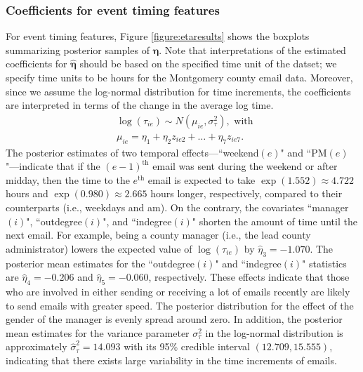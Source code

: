 \documentclass[ba]{imsart}
\numberwithin{equation}{section}
\theoremstyle{plain}
\begin{document}
	\subsubsection{Coefficients for event timing features}
	For event timing features, Figure \ref{figure:etaresults} shows the boxplots summarizing posterior samples of $\boldsymbol{\eta}$. Note that interpretations of the estimated coefficients for $\hat{\boldsymbol{\eta}}$ should be based on the specified time unit of the datset; we specify time units to be hours for the Montgomery county email data. Moreover, since we assume the log-normal distribution for time increments, the coefficients are interpreted in terms of the change in the average log time.
	\begin{equation*}
		\begin{aligned}
			&\log(\tau_{ie}) \sim N(\mu_{ie}, \sigma_\tau^2), \mbox{ with }\\
			&\mu_{ie} = \eta_{1}+\eta_{2} z_{ie2}+\ldots+\eta_{7}z_{ie7}.
		\end{aligned}
	\end{equation*}
	The posterior estimates of two temporal effects---``weekend$(e)$" and ``PM$(e)$"---indicate that if the $(e-1)^{\textrm{th}}$ email was sent during the weekend or after midday, then the time to the $e^{\textrm{th}}$ email is expected to take $\exp(1.552)\approx 4.722$ hours and $\exp(0.980)\approx2.665$ hours longer, respectively, compared to their counterparts (i.e., weekdays and am). On the contrary, the covariates ``manager$(i)$", ``outdegree$(i)$", and ``indegree$(i)$"  shorten the amount of time until the next email. For example, being a county manager (i.e., the lead county administrator) lowers the expected value of $\log(\tau_{ie})$ by $\hat{\eta}_3 = -1.070$. The posterior mean estimates for the  ``outdegree$(i)$" and ``indegree$(i)$" statistics are $\hat{\eta}_4=-0.206$ and $\hat{\eta}_5=-0.060$, respectively. These effects indicate that those who are involved in either sending or receiving a lot of emails recently are likely to send emails with greater speed. The posterior distribution for the effect of the gender of the manager is evenly spread around zero. In addition, the posterior mean estimates for the variance parameter $\sigma^2_\tau$ in the log-normal distribution is approximately $\hat{\sigma}^2_\tau=14.093$ with its 95\% credible interval $(12.709, 15.555)$, indicating that there exists large variability in the time increments of emails.
\end{document}
